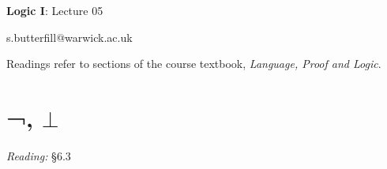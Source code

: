 \documentclass[12pt]{extarticle}
\date{}
\makeatletter
\def \ititle {Origins of Mind}
\def \isubtitle {Lecture 08}
\def \iemail{s.butterfill@warwick.ac.uk}
\makeatother
\begin{document}

\begin{multicols*}{3}

\setlength\footnotesep{1em}









\def \ititle {Logic I}
 
\def \isubtitle {Lecture 05}
 
\begin{center}
 
{\Large
 
\textbf{\ititle}: \isubtitle
 
}
 
 
 
\iemail %
 
\end{center}
 
Readings refer to sections of the course textbook, \emph{Language, Proof and Logic}.
 
 
 
\section{¬, $\bot$}
 
\emph{Reading:} §6.3
 

\end{multicols*}
\end{document}
